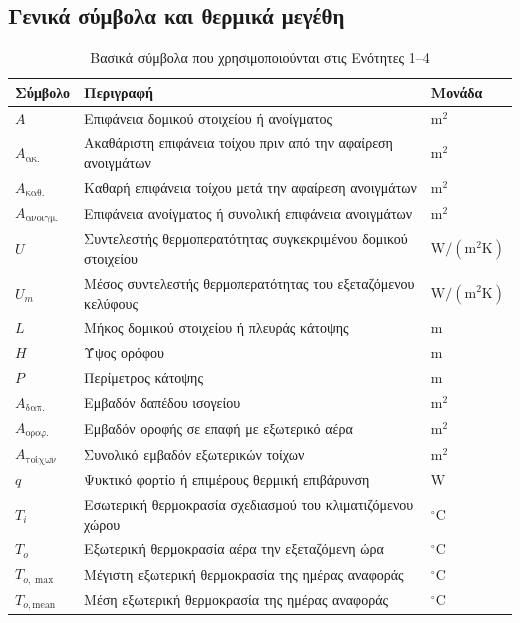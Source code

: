\documentclass[12pt,a4paper]{article}
\begin{document}
\subsection{Γενικά σύμβολα και θερμικά μεγέθη}

\begin{table}[H]
\centering
\small
\caption{Βασικά σύμβολα που χρησιμοποιούνται στις Ενότητες 1--4}
\begin{tabularx}{\textwidth}{C{2.2cm} L C{2.8cm}}
\toprule
\textbf{Σύμβολο} & \textbf{Περιγραφή} & \textbf{Μονάδα} \\
\midrule
\(A\) & Επιφάνεια δομικού στοιχείου ή ανοίγματος & \(\mathrm{m^2}\) \\
\(A_{\text{ακ.}}\) & Ακαθάριστη επιφάνεια τοίχου πριν από την αφαίρεση ανοιγμάτων & \(\mathrm{m^2}\) \\
\(A_{\text{καθ.}}\) & Καθαρή επιφάνεια τοίχου μετά την αφαίρεση ανοιγμάτων & \(\mathrm{m^2}\) \\
\(A_{\text{ανοιγμ.}}\) & Επιφάνεια ανοίγματος ή συνολική επιφάνεια ανοιγμάτων & \(\mathrm{m^2}\) \\
\(U\) & Συντελεστής θερμοπερατότητας συγκεκριμένου δομικού στοιχείου & \(\mathrm{W/(m^2K)}\) \\
\(U_m\) & Μέσος συντελεστής θερμοπερατότητας του εξεταζόμενου κελύφους & \(\mathrm{W/(m^2K)}\) \\
\(L\) & Μήκος δομικού στοιχείου ή πλευράς κάτοψης & \(\mathrm{m}\) \\
\(H\) & Ύψος ορόφου & \(\mathrm{m}\) \\
\(P\) & Περίμετρος κάτοψης & \(\mathrm{m}\) \\
\midrule
\(A_{\text{δαπ.}}\) & Εμβαδόν δαπέδου ισογείου & \(\mathrm{m^2}\) \\
\(A_{\text{οροφ.}}\) & Εμβαδόν οροφής σε επαφή με εξωτερικό αέρα & \(\mathrm{m^2}\) \\
\(A_{\text{τοίχων}}\) & Συνολικό εμβαδόν εξωτερικών τοίχων & \(\mathrm{m^2}\) \\
\midrule
\(q\) & Ψυκτικό φορτίο ή επιμέρους θερμική επιβάρυνση & \(\mathrm{W}\) \\
\(T_i\) & Εσωτερική θερμοκρασία σχεδιασμού του κλιματιζόμενου χώρου & \({}^\circ\mathrm{C}\) \\
\(T_o\) & Εξωτερική θερμοκρασία αέρα την εξεταζόμενη ώρα & \({}^\circ\mathrm{C}\) \\
\(T_{o,\max}\) & Μέγιστη εξωτερική θερμοκρασία της ημέρας αναφοράς & \({}^\circ\mathrm{C}\) \\
\(T_{o,\mathrm{mean}}\) & Μέση εξωτερική θερμοκρασία της ημέρας αναφοράς & \({}^\circ\mathrm{C}\) \\

\end{tabularx}
\end{table}
\end{document}

